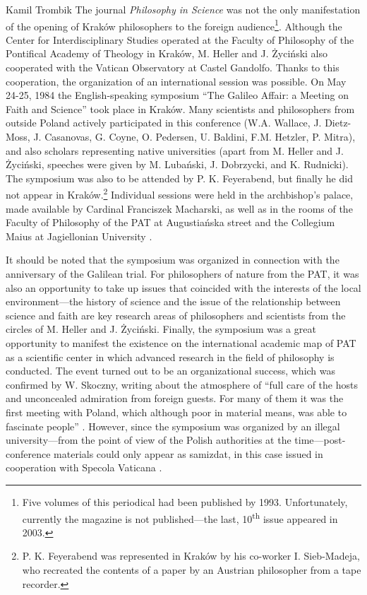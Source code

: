 \begin{artengenv}{Kamil Trombik}
The journal \textit{Philosophy in Science} was not the only manifestation of the opening of Kraków philosophers to the
foreign audience\footnote{Five volumes of this periodical had been published by 1993. Unfortunately, currently the
magazine is not published---the last, 10\textsuperscript{th} issue appeared in 2003.}. Although the Center for
Interdisciplinary Studies operated at the Faculty of Philosophy of the Pontifical Academy of Theology in Kraków, M.
Heller and J. Życiński also cooperated with the Vatican Observatory at Castel Gandolfo. Thanks to this cooperation, the
organization of an international session was possible. On May 24-25, 1984 the English-speaking symposium ``The Galileo
Affair: a Meeting on Faith and Science'' took place in Kraków. Many scientists and philosophers from outside Poland
actively participated in this conference (W.A. Wallace, J. Dietz-Moss, J. Casanovas, G. Coyne, O. Pedersen, U. Baldini,
F.M. Hetzler, P. Mitra), and also scholars representing native universities (apart from M. Heller and J. Życiński,
speeches were given by M. Lubański, J. Dobrzycki, and K. Rudnicki). The symposium was also to be attended by P. K.
Feyerabend, but finally he did not appear in Kraków.\footnote{P. K. Feyerabend was represented in Kraków by his
co-worker I. Sieb-Madeja, who recreated the contents of a paper by an Austrian philosopher from a tape recorder.}
Individual sessions were held in the archbishop's palace, made available by Cardinal Franciszek Macharski, as well as
in the rooms of the Faculty of Philosophy of the PAT at Augustiańska street and the Collegium Maius at Jagiellonian
University
\parencite{skoczny_sympozjum_1984}.

It should be noted that the symposium was organized in connection with the anniversary of the Galilean trial. For
philosophers of nature from the PAT, it was also an opportunity to take up issues that coincided with the interests of
the local environment---the history of science and the issue of the relationship between science and faith are key
research areas of philosophers and scientists from the circles of M. Heller and J. Życiński. Finally, the symposium was
a great opportunity to manifest the existence on the international academic map of PAT as a scientific center in which
advanced research in the field of philosophy is conducted. The event turned out to be an organizational success, which
was confirmed by W. Skoczny, writing about the atmosphere of ``full care of the hosts and unconcealed admiration from
foreign guests. For many of them it was the first meeting with Poland, which although poor in material means, was able
to fascinate people''
\parencite[p.73]{skoczny_sympozjum_1984}.
However, since the symposium was organized by an
illegal university---from the point of view of the Polish authorities at the time---post-conference materials could
only appear as samizdat, in this case issued in cooperation with Specola Vaticana
\parencite{coyne_galileo_1985}.


\end{artengenv}
